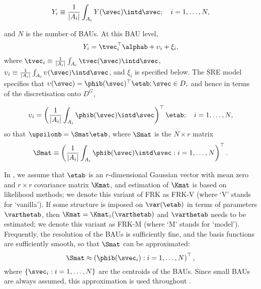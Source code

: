 \begin{equation}\label{eq:Yi0}
Y_i \equiv \frac{1}{|A_i|}\int_{A_i} Y(\svec) \intd \svec; \quad i = 1,\dots,N,
\end{equation}

\noindent and $N$ is the number of BAUs. At this BAU level,
\begin{equation} \label{eq:Yi1}
Y_i = \tvec_i^\top\alphab + \upsilon_i + \xi_i,
\end{equation}
\noindent where $\tvec_i \equiv \frac{1}{|A_i|}\int_{A_i} \tvec(\svec) \intd \svec$, $\upsilon_i\equiv \frac{1}{|A_i|}\int_{A_i} \upsilon(\svec) \intd \svec$, and $\xi_i$ is specified below. The SRE model specifies that $\upsilon(\svec) = \phib(\svec)^\top\etab; \svec \in D,$ and hence in terms of the discretisation onto $D^G$,


$$
\upsilon_i = \left(\frac{1}{|A_i|}\int_{A_i}\phib(\svec)\intd \svec\right)^\top \etab; \quad i = 1,\dots,N,
$$
\noindent so that $\upsilonb = \Smat\etab$, where $\Smat$ is the $N \times r$ matrix
\begin{equation*}%
\Smat \equiv \left(\frac{1}{|A_i|}\int_{A_i}\phib(\svec)\intd\svec : i = 1,\dots,N\right)^\top.
\end{equation*}

In , we assume that $\etab$ is an $r$-dimensional Gaussian vector with mean zero and $r \times r$ covariance matrix $\Kmat$, and estimation of $\Kmat$ is based on likelihood methods; we denote this variant of FRK as FRK-V (where `V' stands for `vanilla'). If some structure is imposed on $\var(\etab)$ in terms of parameters $\varthetab$, then $\Kmat = \Kmat_\circ(\varthetab)$ and $\varthetab$ needs to be estimated; we denote this variant as FRK-M (where `M' stands for `model'). Frequently, the resolution of the BAUs is sufficiently fine, and the basis functions are sufficiently smooth, so that $\Smat$ can be approximated:
\begin{equation}\label{eq:Sapprox}
\Smat \approx \left(\phib(\svec_i) : i = 1,\dots,N\right)^\top,
\end{equation}
where $\{\svec_i: i = 1,\dots,N\}$ are the centroids of the BAUs. Since small BAUs are always assumed, this approximation is used throughout .

